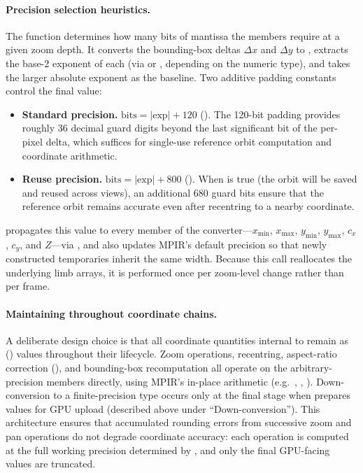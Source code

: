 \paragraph{Precision selection heuristics.}
\label{par:precision-heuristics}
The function  determines how
many bits of mantissa the  members require at a
given zoom depth.  It converts the bounding-box deltas $\Delta x$ and
$\Delta y$ to , extracts the base-2 exponent
of each (via  or , depending on the
numeric type), and takes the larger absolute exponent as the baseline.
Two additive padding constants control the final value:
\begin{itemize}
  \item \textbf{Standard precision.}
        $\text{bits} = |\text{exp}| + 120$
        ().
        The 120-bit padding provides roughly 36 decimal guard digits
        beyond the last significant bit of the per-pixel delta,
        which suffices for single-use reference orbit computation
        and coordinate arithmetic.
  \item \textbf{Reuse precision.}
        $\text{bits} = |\text{exp}| + 800$
        ().
        When  is true (the orbit will be
        saved and reused across views), an additional 680 guard bits
        ensure that the reference orbit remains accurate even after
        recentring to a nearby coordinate.
\end{itemize}
 propagates this value to every
 member of the converter---$x_{\min}$,
$x_{\max}$, $y_{\min}$, $y_{\max}$, $c_x$, $c_y$, and
$Z$---via , and also updates MPIR's default
precision so that newly constructed  temporaries inherit
the same width.  Because this call reallocates the underlying limb
arrays, it is performed once per zoom-level change rather than per
frame.

\paragraph{Maintaining  throughout coordinate chains.}
\label{par:hp-invariant}
A deliberate design choice is that all coordinate quantities internal to
 remain as 
() values throughout their lifecycle.  Zoom operations,
recentring, aspect-ratio correction (), and
bounding-box recomputation all operate on the arbitrary-precision
members directly, using MPIR's in-place arithmetic (e.g.\
, , ).  Down-conversion
to a finite-precision type occurs only at the final stage when
 prepares values for GPU upload (described
above under ``Down-conversion'').  This architecture ensures that
accumulated rounding errors from successive zoom and pan operations do
not degrade coordinate accuracy: each operation is computed at the full
working precision determined by \code{SetPrecision}, and only the
final GPU-facing values are truncated.

